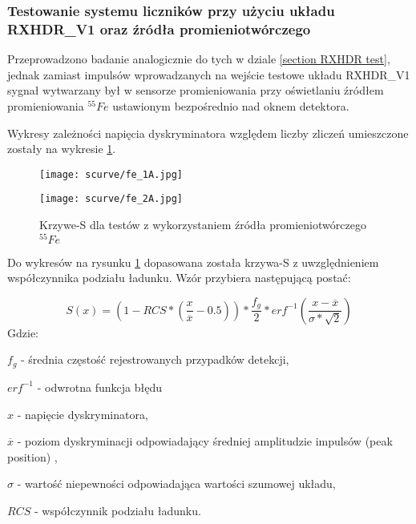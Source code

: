 \subsubsection{Testowanie systemu liczników przy użyciu układu RXHDR\_V1 oraz źródła promieniotwórczego}
\label{section RXHDR fe}

Przeprowadzono badanie analogicznie do tych w dziale \ref{section RXHDR test}, jednak zamiast impulsów wprowadzanych na wejście testowe układu RXHDR\_V1 sygnał wytwarzany był w sensorze promieniowania przy oświetlaniu źródłem promieniowania ${}^{55}Fe$ ustawionym bezpośrednio nad oknem detektora. 

Wykresy zależności napięcia dyskryminatora względem liczby zliczeń umieszczone zostały na wykresie \ref{s curve fe}. 

\begin{figure}[]
        \centering
        \begin{multicols}{2}
                \texttt{[image: scurve/fe\_1A.jpg]} \par
                \texttt{[image: scurve/fe\_2A.jpg]} \par
                
        \end{multicols}
        \caption{Krzywe-S dla testów z wykorzystaniem źródła promieniotwórczego ${}^{55}Fe$}
        \label{s curve fe}
\end{figure}

Do wykresów na rysunku \ref{s curve fe} dopasowana została krzywa-S z uwzględnieniem współczynnika podziału ładunku. Wzór przybiera następującą postać:

\begin{equation}
        \label{test eq}
        S(x) = (1-RCS * (\frac{x}{\overline{x}}-0.5)) * \frac{f_g}{2} * erf^{-1}(\frac{x-\overline{x}}{\sigma*\sqrt{2}})
\end{equation}
Gdzie:
\begin{description}
        \item $f_g$ - średnia częstość rejestrowanych przypadków detekcji,
        \item $erf^{-1}$ - odwrotna funkcja błędu
        \item $x$ - napięcie dyskryminatora,
        \item $\overline{x}$ - poziom dyskryminacji odpowiadający średniej amplitudzie impulsów (peak position) ,
        \item  $\sigma$ - wartość niepewności odpowiadająca wartości szumowej układu,
        \item $RCS$ -  współczynnik podziału ładunku.
\end{description}

